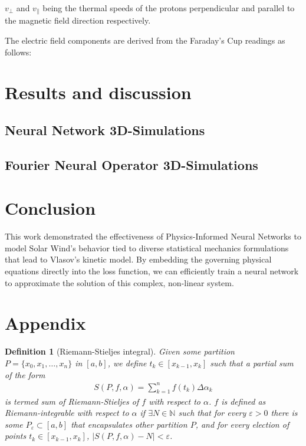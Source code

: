 \documentclass[12pt]{article}
\newtheorem{definition}{Definition}
\begin{document}
$v_\perp$ and $v_\parallel$ being the thermal speeds of the protons perpendicular and parallel to the magnetic field direction respectively.

The electric field components are derived from the Faraday's Cup readings as follows:


\section{Results and discussion}

\subsection{Neural Network 3D-Simulations}

\subsection{Fourier Neural Operator 3D-Simulations}

\section{Conclusion}
This work demonstrated the effectiveness of Physics-Informed Neural Networks to model Solar Wind's behavior tied to diverse statistical mechanics formulations that lead to Vlasov's kinetic model. By embedding the governing physical equations directly into the loss function, we can efficiently train a neural network to approximate the solution of this complex, non-linear system.

\section{Appendix}


\begin{definition}[Riemann-Stieljes integral]
    Given some partition $P = \{x_0, x_1, \ldots, x_n\}$ in $[a, b]$, we define $t_k \in [x_{k-1}, x_k]$ such that a partial sum of the form
    \begin{align*}
        S(P, f, \alpha) = \sum_{k = 1}^n f(t_k) \Delta \alpha_k
    \end{align*}
    is termed sum of Riemann-Stieljes of $f$ with respect to $\alpha$. $f$ is defined as Riemann-integrable with respect to $\alpha$ if $\exists N \in \mathbb{N}$ such that for every $\varepsilon > 0$ there is some $P_\varepsilon \subset [a, b]$ that encapsulates other partition $P$, and for every election of points $t_k \in [x_{k-1}, x_k]$, $\mid S(P, f, \alpha) - N \mid < \varepsilon$.
\end{definition}
\end{document}

